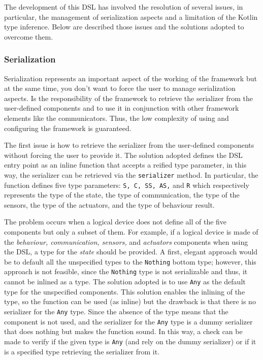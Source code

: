 The development of this DSL has involved the resolution of several issues, in particular, the management of serialization aspects and a limitation of
the Kotlin type inference. Below are described those issues and the solutions adopted to overcome them.

\subsubsection{Serialization}

Serialization represents an important aspect of the working of the framework but at the same time, you don't want to force the user to manage
serialization aspects. Is the responsibility of the framework to retrieve the serializer from the user-defined components and to use it in
conjunction with other framework elements like the communicators. Thus, the low complexity of using and configuring the framework is guaranteed.

The first issue is how to retrieve the serializer from the user-defined components without forcing the user to provide it. The solution adopted
defines the DSL entry point as an inline function that accepts a reified type parameter, in this way, the serializer can be retrieved via the
\texttt{serializer} method. In particular, the function defines five type parameters: \texttt{S, C, SS, AS,} and \texttt{R} which respectively
represents the type of the state, the type of communication, the type of the sensors, the type of the actuators, and the type of behaviour result.

The problem occurs when a logical device does not define all of the five components but only a subset of them.
For example, if a logical device is made of the \emph{behaviour, communication, sensors,} and \emph{actuators} components when using the DSL, a type
for the \emph{state} should be provided. A first, elegant approach would be to default all the unspecified types to the \texttt{Nothing} bottom type;
however, this approach is not feasible, since the \texttt{Nothing} type is not serializable and thus, it cannot be inlined as a type.
The solution adopted is to use \texttt{Any} as the default type for the unspecified components. This solution enables the inlining of the type,
so the function can be used (as inline) but the drawback is that there is no serializer for the \texttt{Any} type.
Since the absence of the type means that the component is not used, and the serializer for the \texttt{Any} type is a dummy serializer that does
nothing but makes the function sound. In this way, a check can be made to verify if the given type is \texttt{Any} (and rely on the dummy serializer)
or if it is a specified type retrieving the serializer from it.

